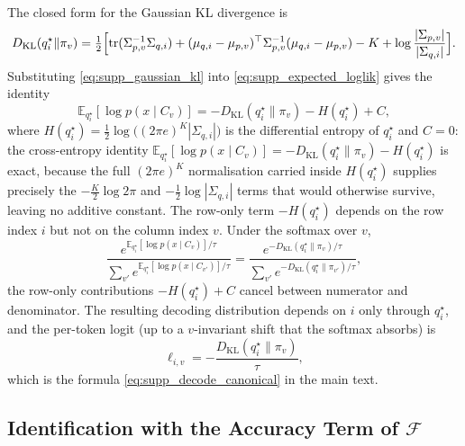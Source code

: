 \documentclass[twoside,11pt]{article}
\begin{document}
The closed form for the Gaussian KL divergence \cite[App.~B]{Bishop2006} is
\begin{equation}
D_{\mathrm{KL}}(q_i^{\star} \| \pi_v)
=
\tfrac{1}{2}\Bigl[
\mathrm{tr}(\Sigma_{p,v}^{-1}\Sigma_{q,i})
+ (\mu_{q,i} - \mu_{p,v})^{\top} \Sigma_{p,v}^{-1} (\mu_{q,i} - \mu_{p,v})
- K
+ \log\frac{|\Sigma_{p,v}|}{|\Sigma_{q,i}|}
\Bigr].
\label{eq:supp_gaussian_kl}
\end{equation}
Substituting \eqref{eq:supp_gaussian_kl} into \eqref{eq:supp_expected_loglik} gives the identity
\begin{equation}
\mathbb{E}_{q_i^{\star}}[\log p(x \mid C_v)]
=
-D_{\mathrm{KL}}(q_i^{\star} \| \pi_v)
- H(q_i^{\star})
+ C,
\label{eq:supp_kl_decomposition}
\end{equation}
where $H(q_i^{\star}) = \tfrac{1}{2}\log\bigl((2\pi e)^K |\Sigma_{q,i}|\bigr)$ is the differential entropy of $q_i^{\star}$ and $C = 0$: the cross-entropy identity $\mathbb{E}_{q_i^{\star}}[\log p(x \mid C_v)] = -D_{\mathrm{KL}}(q_i^{\star} \| \pi_v) - H(q_i^{\star})$ is exact, because the full $(2\pi e)^K$ normalisation carried inside $H(q_i^{\star})$ supplies precisely the $-\tfrac{K}{2}\log 2\pi$ and $-\tfrac{1}{2}\log|\Sigma_{q,i}|$ terms that would otherwise survive, leaving no additive constant. The row-only term $-H(q_i^{\star})$ depends on the row index $i$ but not on the column index $v$. Under the softmax over $v$,
\begin{equation}
\frac{e^{\mathbb{E}_{q_i^{\star}}[\log p(x \mid C_v)]/\tau}}
     {\sum_{v'} e^{\mathbb{E}_{q_i^{\star}}[\log p(x \mid C_{v'})]/\tau}}
=
\frac{e^{-D_{\mathrm{KL}}(q_i^{\star} \| \pi_v)/\tau}}
     {\sum_{v'} e^{-D_{\mathrm{KL}}(q_i^{\star} \| \pi_{v'})/\tau}},
\label{eq:supp_softmax_cancellation}
\end{equation}
the row-only contributions $-H(q_i^{\star}) + C$ cancel between numerator and denominator. The resulting decoding distribution depends on $i$ only through $q_i^{\star}$, and the per-token logit (up to a $v$-invariant shift that the softmax absorbs) is
\begin{equation}
\ell_{i,v} = -\frac{D_{\mathrm{KL}}(q_i^{\star} \| \pi_v)}{\tau},
\label{eq:supp_decode_recovered}
\end{equation}
which is the formula \eqref{eq:supp_decode_canonical} in the main text.

\subsection{Identification with the Accuracy Term of $\mathcal{F}$}
\end{document}
